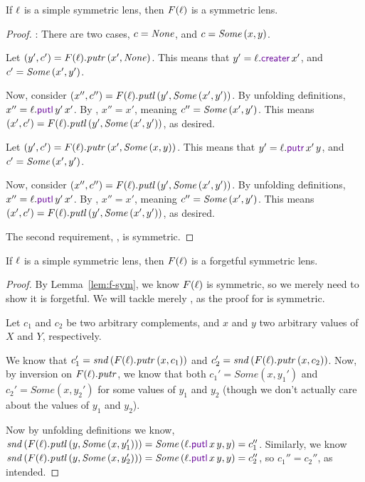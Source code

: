 \documentclass[acmsmall,screen,anonymous]{acmart}
\begin{document}
\begin{mylemma}
  \label{lem:f-sym}
  If $\mathit{\ell}$ is a simple symmetric lens, then $F(\mathit{\ell})$ is a symmetric lens.
\end{mylemma}
\begin{proof}
  \PutRL: There are two cases, $c = \mathit{None}$, and $c = \mathit{Some}\,(x,y)$.

  \begin{case}[c = \None]
    Let $(y',c') = F(\mathit{\ell}).\mathit{putr} \, (x',\mathit{None})$. This means that $y' =
    \Lens.\CreateROf{x'}$, and $c' = \mathit{Some}\,(x',y')$.
    
    Now, consider $(x'',c'') = F(\mathit{\ell}).\mathit{putl} \, (y',\mathit{Some}\,(x',y'))$. By
    unfolding definitions, $x'' = \Lens.\PutLOf{y'}{x'}$. By \CreatePutRL, $x''
    = x'$, meaning $c'' = \mathit{Some}\,(x',y')$. This means $(x',c') =
    F(\mathit{\ell}).\mathit{putl} \, (y',\mathit{Some}\,(x',y'))$, as desired.
  \end{case}

  \begin{case}[c = \SomeOf{(x,y)}]
    Let $(y',c') = F(\mathit{\ell}).\mathit{putr} \, (x',\mathit{Some}\,(x,y))$. This means that $y' =
    \Lens.\PutROf{x'}{y}$, and $c' = \mathit{Some}\,(x',y')$.
    
    Now, consider $(x'',c'') = F(\mathit{\ell}).\mathit{putl} \, (y',\mathit{Some}\,(x',y'))$. By
    unfolding definitions, $x'' = \Lens.\PutLOf{y'}{x'}$. By \PutRL, $x''
    = x'$, meaning $c'' = \mathit{Some}\,(x',y')$. This means $(x',c') =
    F(\mathit{\ell}).\mathit{putl} \, (y',\mathit{Some}\,(x',y'))$, as desired.
  \end{case}

  The second requirement, \PutLR, is symmetric.
\end{proof}


\begin{mylemma}
  If $\mathit{\ell}$ is a simple symmetric lens, then $F(\mathit{\ell})$ is a forgetful symmetric lens.
\end{mylemma}
\begin{proof}
  By Lemma~\ref{lem:f-sym}, we know $F(\mathit{\ell})$ is symmetric, so we merely need
  to show it is forgetful.  We will tackle merely \ForgetfulRL, as the proof for
  \ForgetfulLR is symmetric.

  Let $c_1$ and $c_2$ be two arbitrary complements, and $x$ and $y$ two
  arbitrary values of $X$ and $Y$, respectively.
  
  We know that $c_1' = \mathit{snd} \, (F(\mathit{\ell}).\mathit{putr} \, (x,c_1))$ and $c_2' =
  \mathit{snd} \, (F(\mathit{\ell}).\mathit{putr} \, (x,c_2))$.  Now, by inversion on
  $F(\mathit{\ell}).\mathit{putr}$, we know that both $c_1' = Some(x,y_1')$ and $c_2' =
  Some(x,y_2')$ for some values of $y_1$ and $y_2$ (though we don't actually
  care about the values of $y_1$ and $y_2$).

  Now by unfolding definitions we know, $\Snd \App
  (F(\Lens).\PutLSymOf{(y,\SomeOf{(x,y_1')})}) =
  \SomeOf(\Lens.\PutLOf{x}{y},y) = c_1''$. Similarly, we know $\Snd \App
  (F(\Lens).\PutLSymOf{(y,\SomeOf{(x,y_2')})}) =
  \SomeOf(\Lens.\PutLOf{x}{y},y) = c_2''$, so $c_1'' = c_2''$, as intended.
\end{proof}
\end{document}
